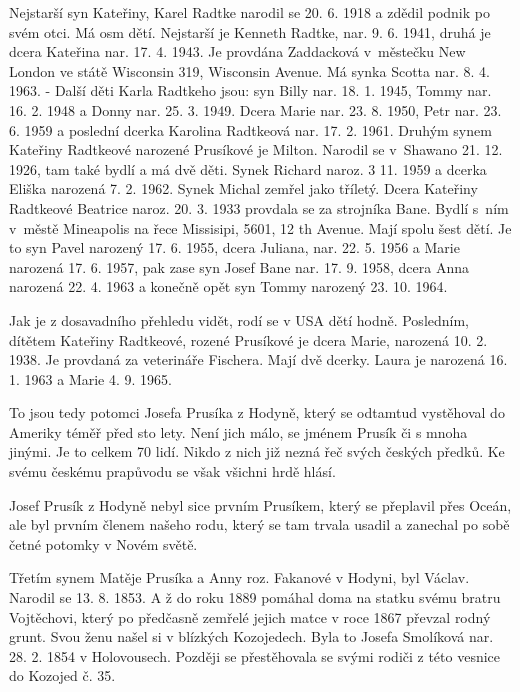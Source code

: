 \documentclass[../dejiny-rodu-prusiku.tex]{subfiles}
\begin{document}
Nejstarší syn Kateřiny, Karel Radtke narodil se 20. 6. 1918 a zdědil podnik po svém otci. Má osm dětí. Nejstarší je Kenneth Radtke, nar. 9. 6. 1941, druhá je dcera Kateřina nar. 17. 4. 1943. Je provdána Zaddacková v městečku New London ve státě Wisconsin 319, Wisconsin Avenue. Má synka Scotta nar. 8. 4. 1963. - Další děti Karla Radtkeho jsou:  syn Billy nar. 18. 1. 1945, Tommy nar. 16. 2. 1948 a Donny nar. 25. 3. 1949. Dcera Marie nar.  23. 8. 1950, Petr nar. 23. 6. 1959 a poslední dcerka Karolina Radtkeová nar. 17. 2. 1961. Druhým synem Kateřiny Radtkeové narozené Prusíkové je Milton. Narodil se v Shawano 21. 12. 1926, tam také bydlí a má dvě děti. Synek Richard naroz. 3 11. 1959 a dcerka Eliška narozená 7. 2. 1962. Synek Michal zemřel jako tříletý. Dcera Kateřiny Radtkeové Beatrice naroz. 20. 3. 1933 provdala se za strojníka Bane. Bydlí s ním v městě Mineapolis na řece Missisipi, 5601, 12 th Avenue. Mají spolu šest dětí. Je to syn Pavel narozený 17. 6. 1955, dcera Juliana, nar. 22. 5. 1956 a Marie narozená 17. 6. 1957, pak zase syn Josef Bane nar. 17. 9. 1958, dcera Anna narozená 22. 4. 1963 a konečně opět syn Tommy narozený 23. 10. 1964.

Jak je z dosavadního přehledu vidět, rodí se v USA dětí hodně. Posledním, dítětem Kateřiny Radtkeové, rozené Prusíkové je dcera Marie, narozená 10. 2. 1938. Je provdaná za veterináře Fischera. Mají dvě dcerky. Laura je narozená 16. 1. 1963 a Marie 4. 9. 1965.

To jsou tedy potomci Josefa Prusíka z Hodyně, který se odtamtud vystěhoval do Ameriky téměř před sto lety. Není jich málo, se jménem Prusík či s mnoha jinými. Je to celkem 70 lidí. Nikdo z nich již nezná řeč svých českých předků. Ke svému českému prapůvodu se však všichni hrdě hlásí.

Josef Prusík z Hodyně nebyl sice prvním Prusíkem, který se přeplavil přes Oceán, ale byl prvním členem našeho rodu, který se tam trvala usadil a zanechal po sobě četné potomky v Novém světě.

Třetím synem Matěje Prusíka a Anny roz. Fakanové v Hodyni, byl Václav. Narodil se 13. 8. 1853. A ž do roku 1889 pomáhal doma na statku svému bratru Vojtěchovi, který po předčasně zemřelé jejich matce v roce 1867 převzal rodný grunt. Svou ženu našel si v blízkých Kozojedech. Byla to Josefa Smolíková nar. 28. 2. 1854 v Holovousech. Později se přestěhovala se svými rodiči z této vesnice do Kozojed č. 35.
\end{document}
